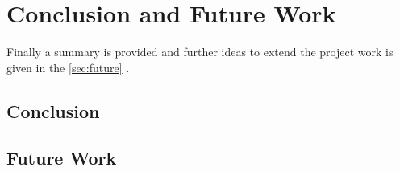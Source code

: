 \chapter{Conclusion and Future Work}\label{chpt:conclusion+future}
\glsresetall

Finally a summary is provided and further ideas to extend the project work is given in the 
\autoref{sec:future} .

\section{Conclusion}\label{sec:conclusion}

\section{Future Work}\label{sec:future}
